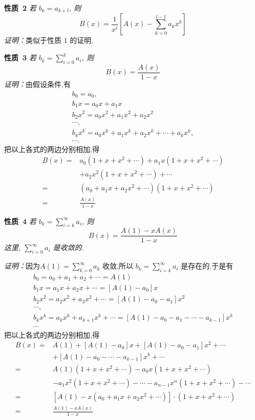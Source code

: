 \documentclass{report}
\begin{document}
\noindent
\textbf{性质\ 2} \textsl{若 $b_{k}=a_{k+l}$, 则
$$
B(x)=\frac{1}{x^{i}}\left[A(x)-\sum_{k=0}^{l-1} a_{k} x^{k}\right]
$$
}
\textsl{证明：}类似于性质 1 的证明.

\noindent
\textbf{性质\ 3} \textsl{若 $b_{k}=\sum_{i=0}^{k} a_{i}$, 则
$$
B(x)=\frac{A(x)}{1-x}
$$
证明：}由假设条件,有
$$
\begin{array}{l}
b_{0}=a_{0}, \\
b_{1} x=a_{0} x+a_{1} x \\
b_{2} x^{2}=a_{0} x^{2}+a_{1} x^{2}+a_{2} x^{2} \\
\cdots, \\
b_{k} x^{k}=a_{0} x^{k}+a_{1} x^{k}+a_{2} x^{k}+\cdots+a_{k} x^{k}, \\
\cdots .
\end{array}
$$
把以上各式的两边分别相加,得
$$
\begin{aligned}
B(x)=& a_{0}\left(1+x+x^{2}+\cdots\right)+a_{1} x\left(1+x+x^{2}+\cdots\right) \\
&+a_{2} x^{2}\left(1+x+x^{2}+\cdots\right)+\cdots \\
=&\left(a_{0}+a_{1} x+a_{2} x^{2}+\cdots\right)\left(1+x+x^{2}+\cdots\right) \\
=& \frac{A(x)}{1-x}
\end{aligned}
$$

\noindent
\textbf{性质\ 4} \textsl{若 $b_{k}=\sum_{i=k}^{\infty} a_{i}$, 则
$$
B(x)=\frac{A(1)-x A(x)}{1-x}
$$
这里, $\sum_{i=0}^{\infty} a_{i}$ 是收敛的. }

\noindent
\textsl{证明：}因为$A(1)=\sum_{k=0}^{\infty} a_{k}$ 收敛,所以 $b_{k}=\sum_{i=k}^{\infty} a_{i}$ 是存在的.于是有
$$
\begin{array}{l}
b_{0}=a_{0}+a_{1}+a_{2}+\cdots=A(1) \\
b_{1} x=a_{1} x+a_{2} x+\cdots=\left[A(1)-a_{0}\right] x \\
b_{2} x^{2}=a_{2} x^{2}+a_{3} x^{2}+\cdots=\left[A(1)-a_{0}-a_{1}\right] x^{2} \\
\cdots, \\
b_{k} x^{k}=a_{k} x^{k}+a_{k+1} x^{k}+\cdots=\left[A(1)-a_{0}-a_{1}-\cdots-a_{k-1}\right] x^{k} \\
\cdots
\end{array}
$$
把以上各式的两边分别相加,得
$$
\begin{aligned}
B(x)=& A(1)+\left[A(1)-a_{0}\right] x+\left[A(1)-a_{0}-a_{1}\right] x^{2}+\cdots \\
&+\left[A(1)-a_{0}-\cdots-a_{k-1}\right] x^{k}+\cdots \\
=& A(1)\left(1+x+x^{2}+\cdots\right)-a_{0} x\left(1+x+x^{2}+\cdots\right) \\
&-a_{1} x^{2}\left(1+x+x^{2}+\cdots\right)-\cdots-a_{n-1} x^{n}\left(1+x+x^{2}+\cdots\right)-\cdots \\
=&\left[A(1)-x\left(a_{0}+a_{1} x+a_{2} x^{2}+\cdots\right)\right] \cdot\left(1+x+x^{2}+\cdots\right) \\
=& \frac{A(1)-x A(x)}{1-x}
\end{aligned}
$$
\end{document}
